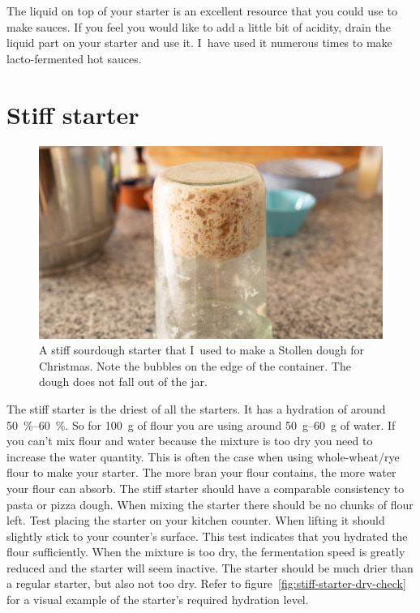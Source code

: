 The liquid on top of your starter is an excellent resource that you could use
to make sauces. If you feel you would like to add a little bit of acidity,
drain the liquid part on your starter and use it. I~have used it numerous
times to make lacto-fermented hot sauces.

\section{Stiff starter}%
\label{section:stiff-starter}

\begin{figure}[!htb]
  \includegraphics[width=\textwidth]{sourdough-starter-stiff.jpg}
  \caption[Stiff starter upside-down]{A stiff sourdough starter that I~used to
      make a Stollen dough for Christmas. Note the bubbles on the edge of the
      container. The dough does not fall out of the jar.}%
  \label{flc:stiff-sourdough-starter}
\end{figure}

The stiff starter is the driest of all the starters. It has a hydration of
around \qtyrange{50}{60}{\percent}. So for \qty{100}{\gram} of flour you are using around
\qtyrange{50}{60}{\gram} of water. If you can't mix flour and water because the
mixture is too dry you need to increase the water quantity. This is often
the case when using whole-wheat/rye flour to make your starter. The
more bran your flour contains, the more water your flour can absorb. The stiff
starter should have a comparable consistency to pasta or pizza dough. When
mixing the starter there should be no chunks of flour left. Test placing
the starter on your kitchen counter. When lifting it should slightly stick
to your counter's surface. This test indicates that you hydrated the flour sufficiently.
When the mixture is too dry, the fermentation speed is greatly reduced and
the starter will seem inactive. The starter should be much drier
than a regular starter, but also not too dry. Refer to figure~\ref{fig:stiff-starter-dry-check}
for a visual example of the starter's required hydration level. 

